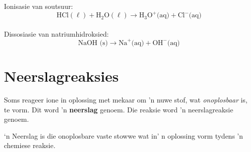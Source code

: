 Ionisasie van soutsuur:\\
        \label{m38720*id339770}\nopagebreak\noindent          
    \begin{equation*}
    \text{HCl} (\ell)  +{\text{H}}_{2}\text{O} (\ell) \to {\text{H}}_{3}{\text{O}}^{+} \text{(aq)} +{\text{Cl}}^{-} \text{(aq)}
      \end{equation*}\\
        \label{m38720*id339831}\nopagebreak\noindent
Dissosiasie van natriumhidroksied:\\          
    \begin{equation*}
    \text{NaOH (s)} \to {\text{Na}}^{+} \text{(aq)} + {\text{OH}}^{-} \text{(aq)}
      \end{equation*}
 \par 
\label{m38720**end}
            \section{Neerslagreaksies}
            \nopagebreak
Soms reageer ione in oplossing met mekaar om 'n nuwe stof, wat \textsl{onoplosbaar} is, te vorm. Dit word 'n \textbf{neerslag} genoem. Die reaksie word 'n neerslagreaksie genoem.\par 
\label{m38719*fhsst!!!underscore!!!id887}
 {‘n Neerslag is die onoplosbare vaste stowwe wat  in' n oplossing vorm tydens 'n chemiese reaksie.} 
\label{m38719*secfhsst!!!underscore!!!id890}
